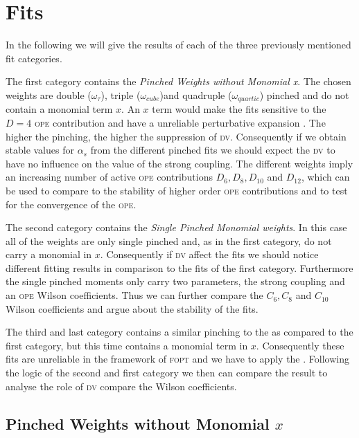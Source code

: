 \documentclass[../../index.tex]{subfiles}
\begin{document}
\section{Fits}
In the following we will give the results of each of the three previously
mentioned fit categories.

The first category contains the \textit{Pinched Weights without Monomial x}. The
chosen weights are double (\(\omega_\tau\)), triple (\(\omega_{cube}\))and
quadruple (\(\omega_{quartic}\)) pinched and do not contain a monomial term
\(x\). An \(x\) term would make the fits sensitive to the \(D=4\) \textsc{ope}
contribution and have a unreliable perturbative expansion \cite{Beneke2012}. The
higher the pinching, the higher the suppression of \textsc{dv}. Consequently if
we obtain stable values for \(\alpha_s\) from the different pinched fits we
should expect the \textsc{dv} to have no influence on the value of the strong
coupling. The different weights imply an increasing number of active
\textsc{ope} contributions \(D_6, D_8, D_{10}\) and \(D_{12}\), which can be
used to compare to the stability of higher order \textsc{ope} contributions and
to test for the convergence of the \textsc{ope}.

The second category contains the \textit{Single Pinched Monomial weights}. In
this case all of the weights are only single pinched and, as in the first category, do not carry a
monomial in \(x\). Consequently if \textsc{dv} affect the fits we should notice
different fitting results in comparison to the fits of the first category.
Furthermore the single pinched moments only carry two parameters, the strong
coupling and an \textsc{ope} Wilson coefficients. Thus we can further compare
the \(C_6, C_8\) and \(C_{10}\) Wilson coefficients and argue about the
stability of the fits.

The third and last category contains a similar pinching to the as compared to
the first category, but this time contains a monomial term in \(x\).
Consequently these fits are unreliable in the framework of \textsc{fopt} and we
have to apply the . Following the logic of the second and
first category we then can compare the result to analyse the role of \textsc{dv}
compare the Wilson coefficients. 

\subsection{Pinched Weights without Monomial \(x\)}
\end{document}
